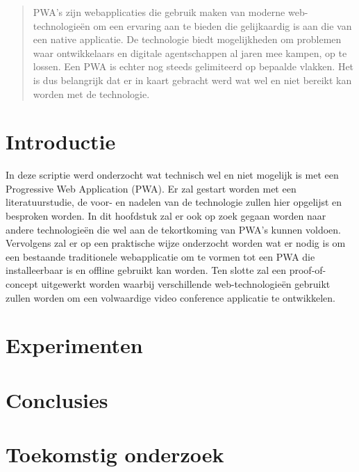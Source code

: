 \documentclass[a0,portrait]{a0poster}
\begin{document}
\begin{multicols}{2}

\color{HoGentAccent1}

\begin{abstract}
	PWA's zijn webapplicaties die gebruik maken van moderne web-technologieën om een ervaring aan te bieden die gelijkaardig is aan die van een native applicatie. 
	De technologie biedt mogelijkheden om problemen waar ontwikkelaars en digitale agentschappen al jaren mee kampen, op te lossen.  Een PWA is echter nog steeds gelimiteerd op bepaalde vlakken. 
	Het is dus belangrijk dat er in kaart gebracht werd wat wel en niet bereikt kan worden met de technologie.
\end{abstract}


\color{HoGentAccent1} 
\section*{Introductie}
\color{black}
\color{black}

	In deze scriptie werd onderzocht wat technisch wel en niet mogelijk is met een Progressive Web Application (PWA). Er zal gestart worden met een literatuurstudie, de voor- en nadelen van de technologie zullen hier opgelijst en besproken worden.
	In dit hoofdstuk zal er ook op zoek gegaan worden naar andere technologieën die wel aan de tekortkoming van PWA's kunnen voldoen.
	Vervolgens zal er op een praktische wijze onderzocht worden wat er nodig is om een bestaande traditionele webapplicatie om te vormen tot een PWA die installeerbaar is en offline gebruikt kan worden.
	Ten slotte zal een proof-of-concept uitgewerkt worden waarbij verschillende web-technologieën gebruikt zullen worden om een volwaardige video conference applicatie te ontwikkelen. 

\color{Black}
\color{HoGentAccent1} 
\section*{Experimenten}
\color{black}


\color{HoGentAccent1} 
\section*{Conclusies}
\color{black}

\color{HoGentAccent1} 
\section*{Toekomstig onderzoek}
\color{black}


\end{multicols}
\end{document}
